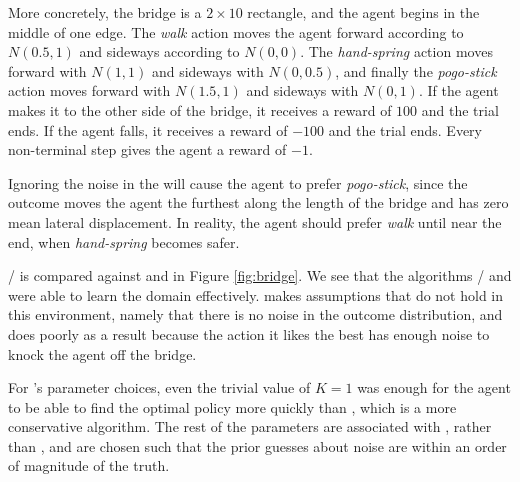 More concretely, the bridge is a $2\times 10$ rectangle, and the agent begins in the middle of one edge. The \emph{walk} action moves the agent forward according to $N(0.5, 1)$ and sideways according to $N(0, 0)$. The \emph{hand-spring} action moves forward with $N(1,1)$ and sideways with $N(0,0.5)$, and finally the \emph{pogo-stick} action moves forward with $N(1.5,1)$ and sideways with $N(0,1)$. If the agent makes it to the other side of the bridge, it receives a reward of $100$ and the trial ends. If the agent falls, it receives a reward of $-100$ and the trial ends. Every non-terminal step gives the agent a reward of $-1$.


Ignoring the noise in the  will cause the agent to prefer \emph{pogo-stick}, since the outcome moves the agent the furthest along the length of the bridge and has zero mean lateral displacement. In reality, the agent should prefer \emph{walk} until near the end, when \emph{hand-spring} becomes safer.

/ is compared against  and  in Figure \ref{fig:bridge}. We see that the algorithms / and  were able to learn the  domain effectively.  makes assumptions that do not hold in this environment, namely that there is no noise in the outcome distribution, and does poorly as a result because the action it likes the best has enough noise to knock the agent off the bridge. 

For 's parameter choices, even the trivial value of $K=1$ was enough for the agent to be able to find the optimal policy more quickly than , which is a more conservative algorithm. The rest of the parameters are associated with , rather than , and are chosen such that the prior guesses about noise are within an order of magnitude of the truth.

